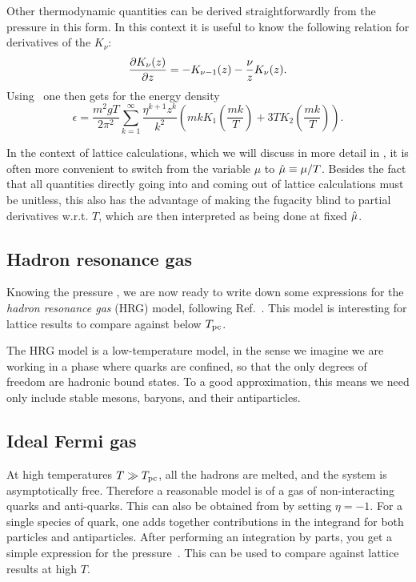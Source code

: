 Other thermodynamic quantities can be derived straightforwardly
from the pressure in this form. In this context it is useful to know
the following relation for derivatives of the $K_\nu$:
\begin{equation}
  \pdv{K_\nu(z)}{z}=-K_{\nu-1}(z)-\frac{\nu}{z}K_\nu(z).
\end{equation}
Using~ one then gets for the energy density
\begin{equation}\label{eq:edensityQM}
  \epsilon=\frac{m^2gT}{2\pi^2}\sum_{k=1}^\infty\frac{\eta^{k+1}z^k}{k^2}
              \left( mk K_1\left(\frac{mk}{T}\right) 
                    + 3TK_2\left(\frac{mk}{T}\right) \right).
\end{equation}

In the context of lattice calculations, which we will discuss in more
detail in , it is often more convenient to switch
from the variable $\mu$ to $\hat{\mu}\equiv\mu/T$. Besides the fact that
all quantities directly going into and coming out of lattice calculations
must be unitless, this also has the advantage of making the
fugacity blind to partial derivatives w.r.t. $T$, which are then 
interpreted as being done at fixed $\hat{\mu}$.

\subsection{Hadron resonance gas}\label{sec:HRG}

Knowing the pressure , we are now ready to write down
some expressions for the {\it hadron resonance gas} (HRG) model,
following Ref.~\cite{karsch_probing_2011}. This model is interesting for lattice
results to compare against below $T_{\rm pc}$. 

The HRG model is a low-temperature model, in the sense we imagine we are working
in a phase where quarks are confined, so that the only degrees of freedom are
hadronic bound states. To a good approximation, this means we need only include
stable mesons, baryons, and their antiparticles.

\subsection{Ideal Fermi gas}\label{sec:fermi}

At high temperatures $T\gg T_{\rm pc}$, all the hadrons are melted, and the system is
asymptotically free. Therefore a reasonable model is of a gas of non-interacting
quarks and anti-quarks. This can also be obtained from 
by setting $\eta=-1$. For a single species of quark, one adds together
contributions in the integrand for both particles and antiparticles.
After performing an integration by parts, you get a simple expression for the
pressure~\cite{hegde_lattice_2008}. 
This can be used to compare against lattice results at high $T$.

